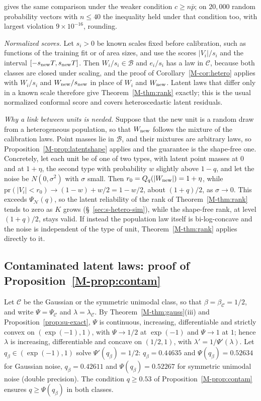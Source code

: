 \documentclass[12pt]{article}
\renewcommand{\_}{\usc\allowbreak}
\theoremstyle{definition}
\numberwithin{equation}{section}
\newcommand{\pr}{\mathrm{pr}}
\newcommand{\B}{\mathcal{B}}
\newcommand{\E}{\mathcal{C}}
\newcommand{\N}{\mathcal{N}}
\begin{document}
\citet[Theorem~4]{hoeffding1956} gives the same comparison under the weaker condition $c \ge n\bar p$; on $20{,}000$ random probability vectors with $n \le 40$ the inequality held under that condition too, with largest violation $9 \times 10^{-16}$, rounding.

\emph{Normalized scores.} Let $s_i > 0$ be known scales fixed before calibration, such as functions of the training fit or of area sizes, and use the scores $|V_i|/s_i$ and the interval $[-s_{\rm new}T, s_{\rm new}T]$. Then $W_i/s_i \in \B$ and $e_i/s_i$ has a law in $\E$, because both classes are closed under scaling, and the proof of Corollary~\ref{M-cor:hetero} applies with $W_i/s_i$ and $W_{\rm new}/s_{\rm new}$ in place of $W_i$ and $W_{\rm new}$. Latent laws that differ only in a known scale therefore give Theorem~\ref{M-thm:rank} exactly; this is the usual normalized conformal score and covers heteroscedastic latent residuals.

\emph{Why a link between units is needed.} Suppose that the new unit is a random draw from a heterogeneous population, so that $W_{\rm new}$ follows the mixture of the calibration laws. Point masses lie in $\B$, and their mixtures are arbitrary laws, so Proposition~\ref{M-prop:latentshape} applies and the guarantee is the shape-free one. Concretely, let each unit be of one of two types, with latent point masses at $0$ and at $1 + \eta$, the second type with probability $w$ slightly above $1 - q$, and let the noise be $N(0, \sigma^2)$ with $\sigma$ small. Then $r_0 = Q_q(|W_{\rm new}|) = 1 + \eta$, while $\pr(|V_i| < r_0) \to (1 - w) + w/2 = 1 - w/2$, about $(1 + q)/2$, as $\sigma \to 0$. This exceeds $\Psi_{\N}(q)$, so the latent reliability of the rank of Theorem~\ref{M-thm:rank} tends to zero as $K$ grows (\S~\ref{sec:s-hetero-sim}), while the shape-free rank, at level $(1 + q)/2$, stays valid. If instead the population law itself is bi-log-concave and the noise is independent of the type of unit, Theorem~\ref{M-thm:rank} applies directly to it.

\subsection{Contaminated latent laws: proof of Proposition~\ref{M-prop:contam}}\label{sec:s-contam}

Let $\E$ be the Gaussian or the symmetric unimodal class, so that $\beta = \beta_{\E} = 1/2$, and write $\Psi = \Psi_{\E}$ and $\lambda = \lambda_{\E}$. By Theorem~\ref{M-thm:gauss}(iii) and Proposition~\ref{prop:su-exact}, $\Psi$ is continuous, increasing, differentiable and strictly convex on $(\exp(-1), 1)$, with $\Psi \to 1/2$ at $\exp(-1)$ and $\Psi \to 1$ at $1$; hence $\lambda$ is increasing, differentiable and concave on $(1/2, 1)$, with $\lambda' = 1/\Psi'(\lambda)$. Let $q_\beta \in (\exp(-1), 1)$ solve $\Psi'(q_\beta) = 1/2$: $q_\beta = 0.44635$ and $\Psi(q_\beta) = 0.52634$ for Gaussian noise, $q_\beta = 0.42611$ and $\Psi(q_\beta) = 0.52267$ for symmetric unimodal noise (double precision). The condition $q \ge 0.53$ of Proposition~\ref{M-prop:contam} ensures $q \ge \Psi(q_\beta)$ in both classes.
\end{document}
